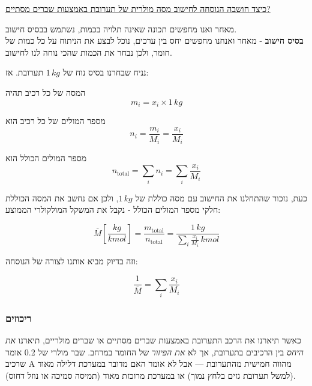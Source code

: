 \documentclass[
  hebrew,
  letterpaper,
  DIV=11,
  numbers=noendperiod]{scrreprt}
\begin{document}
\begin{tcolorbox}[enhanced jigsaw, colback=white, arc=.35mm, coltitle=black, breakable, toptitle=1mm, leftrule=.75mm, colbacktitle=quarto-callout-note-color!10!white, opacitybacktitle=0.6, bottomtitle=1mm, titlerule=0mm, opacityback=0, colframe=quarto-callout-note-color-frame, title=\textcolor{quarto-callout-note-color}{\faInfo}\hspace{0.5em}{הערה}, rightrule=.15mm, bottomrule=.15mm, toprule=.15mm, left=2mm]

\ul{כיצד חושבה הנוסחה לחישוב מסה מולרית של תערובת באמצעות שברים מסתיים?}

מאחר ואנו מחפשים תכונה שאינה תלויה בכמות, נשתמש בבסיס חישוב.\\
\textbf{בסיס חישוב} - מאחר ואנחנו מחפשים יחס בין ערכים, נוכל לבצע את
הניתוח על כל כמות של חומר, ולכן נבחר את הכמות שהכי נוחה לנו לחישוב.

נניח שבחרנו בסיס נוח של \(1\,kg\) תערובת. אז:

המסה של כל רכיב תהיה\\
\[
m_{i} = x_{i} \times 1\,kg
\]

מספר המולים של כל רכיב הוא\\
\[
n_{i} = \frac{m_{i}}{M_{i}} = \frac{x_{i}}{M_{i}}
\]

מספר המולים הכולל הוא\\
\[
n_{\text{total}} = \sum_{i} n_{i} = \sum_{i} \frac{x_{i}}{M_{i}}
\]

כעת, נזכור שהתחלנו את החישוב עם מסה כוללת של \(1\,kg\), ולכן אם נחשב את
המסה הכוללת חלקי מספר המולים הכולל - נקבל את המשקל המולקולרי הממוצע:

\[
\overline{M}\left[\frac{kg}{kmol}\right] = \frac{m_{\text{total}}}{n_{\text{total}}} = \frac{1\,kg}{\sum_{i} \frac{x_{i}}{M_{i}}\,kmol}
\]

וזה בדיוק מביא אותנו לצורה של הנוסחה:

\[
\boxed{\frac{1}{\overline{M}} = \sum_{i} \frac{x_{i}}{M_{i}}}
\]

\end{tcolorbox}

\subsubsection{\texorpdfstring{{ריכוזים}}{ריכוזים}}\label{ux5e8ux5d9ux5dbux5d5ux5d6ux5d9ux5dd}

{כאשר תיארנו את הרכב התערובת באמצעות שברים מסתיים או שברים מולריים},
{תיארנו \emph{את היחס} בין הרכיבים בתערובת, אך לא \emph{את הפיזור} של
החומר במרחב}. {שבר מולרי של 0.2 אומר שרכיב} A {מהווה חמישית מהתערובת ---
אבל לא אומר האם מדובר במערכת דלילה מאוד (למשל תערובת גזים בלחץ נמוך) או
במערכת מרוכזת מאוד (תמיסה סמיכה או נוזל דחוס)}. {}
\end{document}

